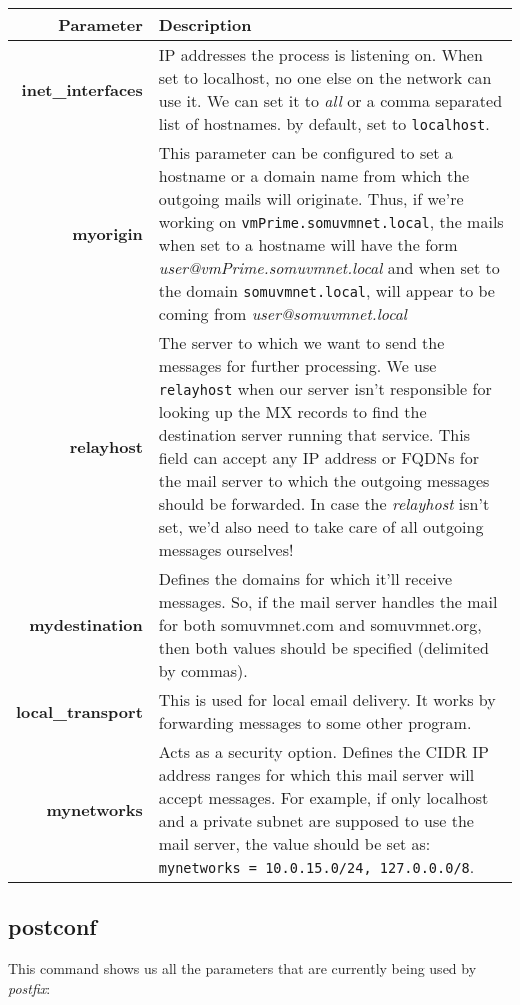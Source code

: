 \noindent
\begin{tabular}{rM{0.76}}
	\toprule
	\textbf{Parameter} &\textbf{Description} \\
	\midrule
	\textbf{inet\_interfaces}	&IP addresses the process is listening on. When set to localhost, no one else on the network can use it. We can set it to \textit{all} or a comma separated list of hostnames. by default, set to \verb|localhost|.\\
	\midrule
	\textbf{myorigin}	&This parameter can be configured to set a hostname or a domain name from which the outgoing mails will originate. Thus, if we're working on \verb|vmPrime.somuvmnet.local|, the mails when set to a hostname will have the form \textit{user@vmPrime.somuvmnet.local} and when set to the domain \verb|somuvmnet.local|, will appear to be coming from \textit{user@somuvmnet.local} \\
	\midrule
	\textbf{relayhost}	&The server to which we want to send the messages for further processing. We use \verb|relayhost| when our server isn't responsible for looking up the MX records to find the destination server running that service. This field can accept any IP address or FQDNs for the mail server to which the outgoing messages should be forwarded. In case the \textit{relayhost} isn't set, we'd also need to take care of all outgoing messages ourselves! \\
	\midrule
	\textbf{mydestination}	&Defines the domains for which it'll receive messages. So, if the mail server handles the mail for both somuvmnet.com and somuvmnet.org, then both values should be specified (delimited by commas).\\
	\midrule
	\textbf{local\_transport}	&This is used for local email delivery. It works by forwarding messages to some other program.\\
	\midrule
	\textbf{mynetworks}		&Acts as a security option. Defines the CIDR IP address ranges for which this mail server will accept messages. For example, if only localhost and a private subnet are supposed to use the mail server, the value should be set as: \verb|mynetworks = 10.0.15.0/24, 127.0.0.0/8|. \\
	\bottomrule
\end{tabular}

\subsection{postconf}
This command shows us all the parameters that are currently being used by \textit{postfix}:

